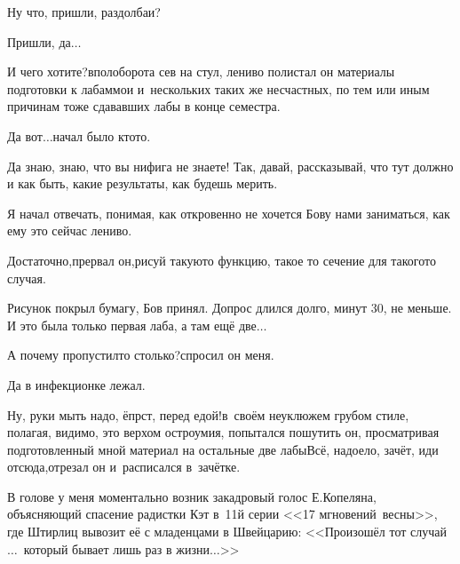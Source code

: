 \diagdash Ну что, пришли, раздолбаи? 

\diagdash Пришли, да$\ldots$

\diagdash И чего хотите?\mdash вполоборота сев на стул, лениво полистал он материалы подготовки к лабам\mdash мои и~нескольких таких же несчастных, по тем или иным причинам тоже сдававших лабы в конце семестра.

\diagdash Да вот$\ldots$\mdash начал было кто\sdash то.

\diagdash Да знаю, знаю, что вы нифига не знаете! Так, давай, рассказывай, что тут должно и как быть, какие результаты, как будешь мерить.

Я начал отвечать, понимая, как откровенно не хочется Б\sdash ову нами заниматься, как ему это сейчас лениво.

\diagdash Достаточно,\mdash прервал он,\mdash рисуй такую\sdash то функцию, такое то сечение для такого\sdash то случая.

Рисунок покрыл бумагу, Б\sdash ов принял. Допрос длился долго, минут 30, не меньше. И это была только первая лаба, а там ещё две$\ldots$

\diagdash А почему пропустил\sdash то столько?\mdash спросил он меня.

\diagdash Да в инфекционке лежал.

\diagdash Ну, руки мыть надо, ёпрст, перед едой!\mdash в~своём неуклюжем грубом стиле, полагая, видимо, это верхом остроумия, попытался пошутить он, просматривая подготовленный мной материал на остальные две лабы\mdash Всё, надоело, зачёт, иди отсюда,\mdash отрезал он и~расписался в~зачётке.

В голове у меня моментально возник закадровый голос Е.\thinspace Копеляна, объясняющий спасение радистки Кэт в~11\sdash й серии <<17 мгновений~весны>>, где Штирлиц вывозит её с младенцами в Швейцарию: <<Произошёл тот случай~$\ldots$~который бывает лишь раз в жизни$\ldots$>>



\begin{center}
\end{center}